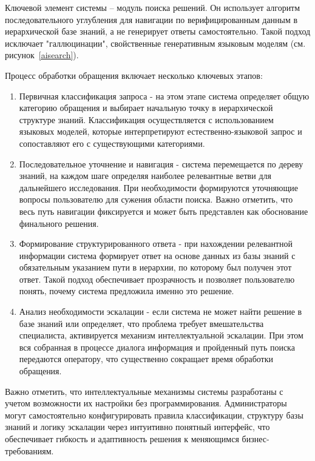 Ключевой элемент системы – модуль поиска решений. Он использует алгоритм последовательного углубления для навигации по верифицированным данным в иерархической базе знаний, а не генерирует ответы самостоятельно. Такой подход исключает "галлюцинации", свойственные генеративным языковым моделям (см. рисунок~\ref{aisearch}).


Процесс обработки обращения включает несколько ключевых этапов:
\begin{enumerate}[label=\arabic*.]
    \item Первичная классификация запроса - на этом этапе система определяет общую категорию обращения и выбирает начальную точку в иерархической структуре знаний. Классификация осуществляется с использованием языковых моделей, которые интерпретируют естественно-языковой запрос и сопоставляют его с существующими категориями.
    \item Последовательное уточнение и навигация - система перемещается по дереву знаний, на каждом шаге определяя наиболее релевантные ветви для дальнейшего исследования. При необходимости формируются уточняющие вопросы пользователю для сужения области поиска. Важно отметить, что весь путь навигации фиксируется и может быть представлен как обоснование финального решения.
    \item Формирование структурированного ответа - при нахождении релевантной информации система формирует ответ на основе данных из базы знаний с обязательным указанием пути в иерархии, по которому был получен этот ответ. Такой подход обеспечивает прозрачность и позволяет пользователю понять, почему система предложила именно это решение.
    \item Анализ необходимости эскалации - если система не может найти решение в базе знаний или определяет, что проблема требует вмешательства специалиста, активируется механизм интеллектуальной эскалации. При этом вся собранная в процессе диалога информация и пройденный путь поиска передаются оператору, что существенно сокращает время обработки обращения.
\end{enumerate}

Важно отметить, что интеллектуальные механизмы системы разработаны с учетом возможности их настройки без программирования. Администраторы могут самостоятельно конфигурировать правила классификации, структуру базы знаний и логику эскалации через интуитивно понятный интерфейс, что обеспечивает гибкость и адаптивность решения к меняющимся бизнес-требованиям.

